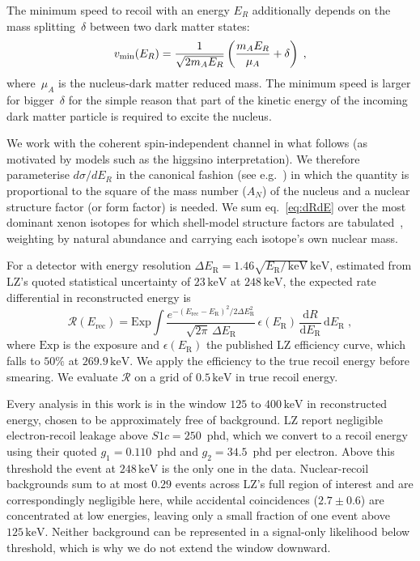 \documentclass[aps,prl,twocolumn,superscriptaddress,nofootinbib,floatfix]{revtex4-2}
\newcommand{\keV}{\ensuremath{\,\mathrm{keV}}}
\newcommand{\ER}{\ensuremath{E_R}}
\newcommand{\vmin}{\ensuremath{v_{\rm min}}}
\begin{document}
The minimum speed to recoil with an energy $\ER$ additionally depends on the mass splitting~$\delta$ between two dark matter states:
\begin{equation}
\label{eq:vmin}
\vmin(\ER) = \frac{1}{\sqrt{2 m_A \ER}}\left(\frac{m_A \ER}{\mu_A} + \delta\right)\;,
\end{equation}
where~$\mu_{A}$ is the nucleus-dark matter reduced mass. The minimum speed is larger for bigger~$\delta$ for the simple reason that part of the kinetic energy of the incoming dark matter particle is required to excite the nucleus.

We work with the coherent spin-independent channel in what follows (as motivated by models such as the higgsino interpretation).
We therefore parameterise $d \sigma/d \ER$ in the canonical fashion (see e.g.~\cite{McCabe:2010zh}) in which the quantity is proportional to the square of the mass number ($A_N$) of the nucleus and a nuclear structure factor (or form factor) is needed. We sum eq.~\eqref{eq:dRdE} over the most dominant xenon isotopes for which shell-model structure factors are tabulated~\cite{Vietze:2014vsa}, weighting by natural abundance and carrying each isotope's own nuclear mass.

For a detector with energy resolution $\Delta E_\text{R} = 1.46\sqrt{E_\text{R}/\keV}\keV$, estimated from LZ's quoted statistical uncertainty of $23\keV$ at $248\keV$, the expected rate differential in reconstructed energy is
\begin{equation}
\mathcal{R}(E_\text{rec}) = \text{Exp} \int
\frac{e^{-(E_\text{rec}-E_\text{R})^2 / 2\Delta E_\text{R}^2}}{\sqrt{2\pi}\,\Delta E_\text{R}}
\, \epsilon(E_\text{R}) \, \frac{\text{d}R}{\text{d}E_\text{R}} \, \text{d}E_\text{R} \;,
\label{eq:smeared}
\end{equation}
where $\text{Exp}$ is the exposure and $\epsilon(E_\text{R})$ the published LZ efficiency curve, which falls to $50\%$ at $269.9\keV$. We apply the efficiency to the true recoil energy before smearing. 
 We evaluate $\mathcal{R}$ on a grid of $0.5\keV$ in true recoil energy.
 
 Every analysis in this work is in the window $125$ to $400\keV$ in reconstructed energy, chosen to be approximately free of background. 
 LZ report negligible electron-recoil leakage above $S1c = 250$~phd, which we convert to a recoil energy using their quoted $g_1 = 0.110$~phd and $g_2 = 34.5$~phd per electron. 
 Above this threshold the event at $248\keV$ is the only one in the data.
Nuclear-recoil backgrounds sum to at most $0.29$ events across LZ's full region of interest and are correspondingly negligible here, while accidental coincidences ($2.7\pm0.6$) are concentrated at low energies, leaving only a small fraction of one event above $125\keV$. 
Neither background can be represented in a signal-only likelihood below threshold, which is why we do not extend the window downward.
\end{document}
